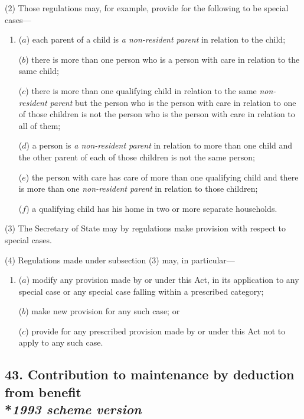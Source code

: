 \documentclass[12pt,a4paper]{article}
\begin{document}
(2) Those regulations may, for example, provide for the following to be special cases—
\begin{enumerate}\item[]
($a$) each parent of a child is 
\emph{a non-resident parent}  %
in relation to the child;

($b$) there is more than one person who is a person with care in relation to the same child;

($c$) there is more than one qualifying child in relation to the same 
\emph{non-resident parent}  %
but the person who is the person with care in relation to one of those children is not the person who is the person with care in relation to all of them;

($d$) a person is 
\emph{a non-resident parent}  %
in relation to more than one child and the other parent of each of those children is not the same person;

($e$) the person with care has care of more than one qualifying child and there is more than one 
\emph{non-resident parent}  %
in relation to those children;

($f$) a qualifying child has his home in two or more separate households.
\end{enumerate}

(3) The Secretary of State may by regulations make provision with respect to special cases.

(4) Regulations made under subsection (3)  may, in particular—
\begin{enumerate}\item[]
($a$) modify any provision made by or under this Act, in its application to any special case or any special case falling within a prescribed category;

($b$) make new provision for any such case; or

($c$) provide for any prescribed provision made by or under this Act not to apply to any such case.
\end{enumerate}


\subsection[43. Contribution to maintenance by deduction from benefit --- \emph{1993 scheme version}]{43. Contribution to maintenance by deduction from benefit\\*\emph{1993 scheme version}}
\end{document}
